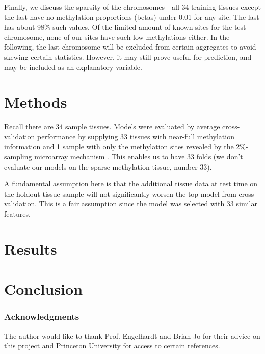 \documentclass{article} %
\begin{document}
Finally, we discuss the sparsity of the chromosomes - all 34 training tissues except the last have no methylation proportions (betas) under 0.01 for any site. The last has about 98\% such values. Of the limited amount of known sites for the test chromosome, none of our sites have such low methylations either. In the following, the last chromosome will be excluded from certain aggregates to avoid skewing certain statistics. However, it may still prove useful for prediction, and may be included as an explanatory variable.


\section{Methods}

Recall there are 34 sample tissues. Models were evaluated by average cross-validation performance by supplying 33 tissues with near-full methylation information and 1 sample with only the methylation sites revealed by the 2\%-sampling microarray mechanism \cite{infinium}. This enables us to have 33 folds (we don't evaluate our models on the sparse-methylation tissue, number 33). 

A fundamental assumption here is that the additional tissue data at test time on the holdout tissue sample will not significantly worsen the top model from cross-validation. This is a fair assumption since the model was selected with 33 similar features.

\section{Results}

\section{Conclusion}


\subsubsection*{Acknowledgments}

The author would like to thank Prof. Engelhardt and Brian Jo for their advice on this project and Princeton University for access to certain references.



\end{document}

